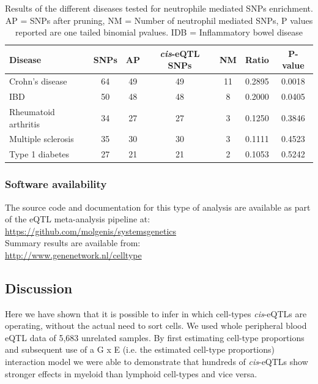 \begin{table}[h]
  \centering
  {\footnotesize
  \begin{tabular}{ | l | c | c | c | c | c | c | }
  {\bf Disease }          & {\bf SNPs} & {\bf AP} & {\bf \emph{cis}-eQTL SNPs} & {\bf NM} & {\bf Ratio} & {\bf P-value}\\
  \hline
  Crohn's disease         & 64   & 49 & 49 & 11 & 0.2895 & 0.0018\\
  IBD                     & 50   & 48 & 48 & 8 & 0.2000 & 0.0405\\
  Rheumatoid arthritis    & 34   & 27 & 27 & 3 & 0.1250 & 0.3846\\
  Multiple sclerosis      & 35   & 30 & 30 & 3 & 0.1111 & 0.4523\\
  Type 1 diabetes         & 27   & 21 & 21 & 2 & 0.1053 & 0.5242\\
  \end{tabular}
  }
  \caption[Disease enrichment]{Results of the different diseases tested for neutrophile mediated SNPs enrichment. AP = SNPs after pruning, NM = Number of 
  neutrophil mediated SNPs, P values reported are one tailed binomial pvalues. IDB = Inflammatory bowel disease}
  \label{tbl:tblDisease}
\end{table}


  \subsubsection{Software availability}
  The source code and documentation for this type of analysis are available as part of the eQTL meta-analysis pipeline at:\\
  \url{https://github.com/molgenis/systemsgenetics}\\
  Summary results are available from:\\
  \url{http://www.genenetwork.nl/celltype}

  \subsection{Discussion}
  Here we have shown that it is possible to infer in which cell-types \emph{cis}-eQTLs are operating, without 
  the actual need to sort cells. We used whole peripheral blood eQTL data of 5,683 unrelated samples. 
  By first estimating cell-type proportions and subsequent use of a G x E (i.e. the estimated cell-type 
  proportions) interaction model we were able to demonstrate that hundreds of \emph{cis}-eQTLs show stronger 
  effects in myeloid than lymphoid cell-types and vice versa. 

